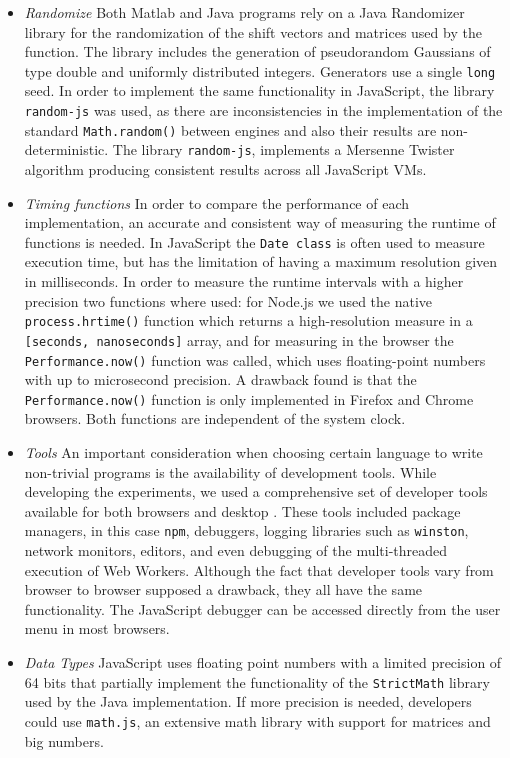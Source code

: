 \documentclass[journal,onecolumn]{IEEEtran}
\begin{document}
\begin{itemize}
\item {\em Randomize} Both Matlab and Java programs rely on a 
Java Randomizer library for the 
randomization of the shift vectors and matrices used by the function.
The library includes the generation of pseudorandom Gaussians of type
double and uniformly distributed integers. Generators use a single
{\tt long} seed. In order to implement the same functionality in
JavaScript, the library {\tt random-js} was used, as there are inconsistencies 
in the implementation of the standard {\tt Math.random()} between engines
and also their results are non-deterministic. 
The library {\tt random-js}, implements a Mersenne Twister algorithm producing 
consistent results across all JavaScript VMs.
\item {\em Timing functions} In order to compare the performance of 
each implementation, an accurate and consistent way of measuring 
the runtime of functions is needed.
In JavaScript the {\tt Date class} is often used 
to measure execution time, but has the limitation of having a maximum 
resolution given in milliseconds.
In order to measure the runtime intervals with a higher precision two functions
where used: for Node.js we used the native {\tt process.hrtime()} function
which returns a high-resolution measure in a {\tt [seconds, nanoseconds]}
array, and for measuring in the browser the {\tt Performance.now()} function was called,
which uses floating-point numbers with up to microsecond precision. 
A drawback found is that the {\tt Performance.now()} function is only implemented
in Firefox and Chrome browsers. Both functions are independent of the system clock. 
\item {\em Tools} An important consideration when choosing certain language to write non-trivial programs is the availability of development tools. While developing
the experiments, we used a comprehensive set of developer tools available for both
browsers and desktop \cite{tilkov2010node}. These tools included
package managers, in this case {\tt npm}, debuggers, logging libraries
such as {\tt winston}, 
network monitors, editors, and even debugging of the multi-threaded execution of Web Workers.
Although the fact that developer tools vary from browser to browser
supposed a drawback, they all have the same functionality. The
JavaScript debugger can be accessed directly from the user menu in
most browsers. 
\item {\em Data Types} JavaScript uses floating point numbers with a 
limited precision of 64 bits that partially implement the functionality of
the {\tt StrictMath} library used by the Java implementation. If more precision
is needed, developers could use {\tt math.js}, an extensive math library with
support for matrices and big numbers.
\end{itemize}
\end{document}
